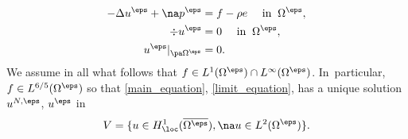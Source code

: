 \begin{equation} \label{limit_equation}
\begin{aligned}
-\Delta u^\eps + \na p^\eps & = f - \rho e \quad \text{ in } \: \Omega^\eps, \\
\div u^\eps & = 0 \quad \text{ in } \: \Omega^\eps, \\
u^\eps \vert_{\pa \Omega^\eps} & = 0.
\end{aligned}
\end{equation}
We assume in all what follows that $f \in L^1(\Omega^\eps) \cap L^\infty(\Omega^\eps)$. In~particular, $f \in L^{6/5}(\Omega^\eps)$ so that \eqref{main_equation}, \resp \eqref{limit_equation}, has a unique solution $u^{N,\eps}$, \resp $u^\eps$ in
\[
V = \{ u \in H^1_{\loc}(\overline{\Omega^\eps}), \na u \in L^2(\Omega^\eps)\}.
\]
